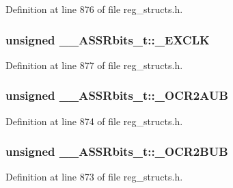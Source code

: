 Definition at line 876 of file reg\+\_\+structs.\+h.

\hypertarget{union_____a_s_s_rbits__t_a47b1f954a274acce1746ebb0cf480bd2}{
\subsubsection[{\+\_\+\+E\+X\+C\+L\+K}]{\setlength{\rightskip}{0pt plus 5cm}unsigned \+\_\+\+\_\+\+A\+S\+S\+Rbits\+\_\+t\+::\+\_\+\+E\+X\+C\+L\+K}}\label{union_____a_s_s_rbits__t_a47b1f954a274acce1746ebb0cf480bd2}


Definition at line 877 of file reg\+\_\+structs.\+h.

\hypertarget{union_____a_s_s_rbits__t_a3134d4cb0de8d459d6618c5a80665254}{
\subsubsection[{\+\_\+\+O\+C\+R2\+A\+U\+B}]{\setlength{\rightskip}{0pt plus 5cm}unsigned \+\_\+\+\_\+\+A\+S\+S\+Rbits\+\_\+t\+::\+\_\+\+O\+C\+R2\+A\+U\+B}}\label{union_____a_s_s_rbits__t_a3134d4cb0de8d459d6618c5a80665254}


Definition at line 874 of file reg\+\_\+structs.\+h.

\hypertarget{union_____a_s_s_rbits__t_a415fb80c44c78511a8b30c0d6dce5140}{
\subsubsection[{\+\_\+\+O\+C\+R2\+B\+U\+B}]{\setlength{\rightskip}{0pt plus 5cm}unsigned \+\_\+\+\_\+\+A\+S\+S\+Rbits\+\_\+t\+::\+\_\+\+O\+C\+R2\+B\+U\+B}}\label{union_____a_s_s_rbits__t_a415fb80c44c78511a8b30c0d6dce5140}


Definition at line 873 of file reg\+\_\+structs.\+h.

